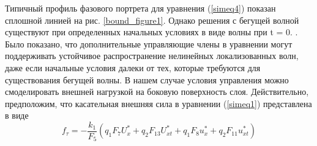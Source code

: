 
Типичный профиль фазового портрета для уравнения (\ref{simeq4}) показан сплошной линией на рис. \ref{bound_figure1}. Однако решения с бегущей волной существуют при определенных начальных условиях в виде волны при t = 0. . Было показано, что дополнительные управляющие члены в уравнении могут поддерживать устойчивое распространение нелинейных локализованных волн, даже если начальные условия далеки от тех, которые требуются для существования бегущей волны. В нашем случае условия управления можно смоделировать внешней нагрузкой на боковую поверхность слоя. Действительно, предположим, что касательная внешняя сила в уравнении (\ref{simeq1}) представлена в виде
\begin{equation}
	f_\tau=-\frac{k_1}{F_5}\left(q_1 F_7 U^*_x+q_2 F_{13} U^*_{xt}+q_1 F_8 u^*_x+q_2 F_{11} u^*_{xt}\right) \label{control}
\end{equation}
